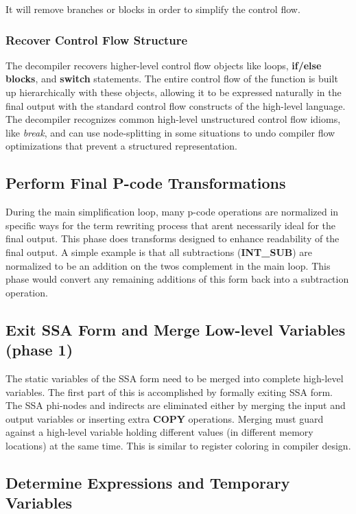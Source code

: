 It will remove branches or blocks in order to simplify the control flow.\hypertarget{index_step5f}{}\subsubsection{Recover Control Flow Structure}\label{index_step5f}
The decompiler recovers higher-\/level control flow objects like loops, {\bfseries{if/{\bfseries{else}} blocks}}, and {\bfseries{switch}} statements. The entire control flow of the function is built up hierarchically with these objects, allowing it to be expressed naturally in the final output with the standard control flow constructs of the high-\/level language. The decompiler recognizes common high-\/level unstructured control flow idioms, like {\itshape break}, and can use node-\/splitting in some situations to undo compiler flow optimizations that prevent a structured representation.\hypertarget{index_step6}{}\subsection{Perform Final P-\/code Transformations}\label{index_step6}
During the main simplification loop, many p-\/code operations are normalized in specific ways for the term rewriting process that aren\textquotesingle{}t necessarily ideal for the final output. This phase does transforms designed to enhance readability of the final output. A simple example is that all subtractions ({\bfseries{I\+N\+T\+\_\+\+S\+UB}}) are normalized to be an addition on the twos complement in the main loop. This phase would convert any remaining additions of this form back into a subtraction operation.\hypertarget{index_step7}{}\subsection{Exit S\+S\+A Form and Merge Low-\/level Variables (phase 1)}\label{index_step7}
The static variables of the S\+SA form need to be merged into complete high-\/level variables. The first part of this is accomplished by formally exiting S\+SA form. The S\+SA phi-\/nodes and indirects are eliminated either by merging the input and output variables or inserting extra {\bfseries{C\+O\+PY}} operations. Merging must guard against a high-\/level variable holding different values (in different memory locations) at the same time. This is similar to register coloring in compiler design.\hypertarget{index_step8}{}\subsection{Determine Expressions and Temporary Variables}\label{index_step8}
